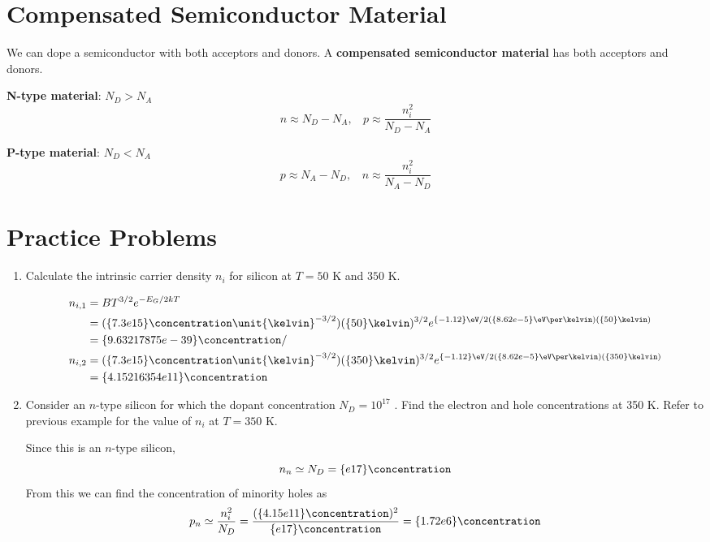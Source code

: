 \section{Compensated Semiconductor Material}
We can dope a semiconductor with both acceptors and donors. A \textbf{compensated semiconductor material} has both acceptors and donors.

\textbf{N-type material}: $N_D > N_A$
\[n \approx N_D - N_A, ~~~~ p \approx \frac{n_i^2}{N_D - N_A}\]

\textbf{P-type material}: $N_D < N_A$
\[p \approx N_A - N_D, ~~~~ n \approx \frac{n_i^2}{N_A - N_D}\]

\section{Practice Problems}
    \begin{enumerate}
        \item Calculate the intrinsic carrier density $n_i$ for silicon at $T = 50$ K and $350$ K.
        \begin{Ans}
            \begin{align*}
                n_{i,1} &= BT^{3/2} e^{-E_G / 2kT} \\
                &= (\qty{7.3e15}{\concentration} \unit{\kelvin}^{-3/2})(\qty{50}{\kelvin})^{3/2} e^{\qty{-1.12}{\eV} / 2(\qty{8.62e-5}{\eV\per\kelvin}) (\qty{50}{\kelvin})} \\
                &= \qty{9.63217875e-39}{\concentration} / \\
                n_{i,2} &= (\qty{7.3e15}{\concentration} \unit{\kelvin}^{-3/2})(\qty{350}{\kelvin})^{3/2} e^{\qty{-1.12}{\eV} / 2(\qty{8.62e-5}{\eV\per\kelvin})(\qty{350}{\kelvin})} \\
                &= \qty{4.15216354e11}{\concentration}
            \end{align*}
        \end{Ans}

        \item Consider an $n$-type silicon for which the dopant concentration $N_D = 10^{17}$ \conc. Find the electron and hole concentrations at 350 K. Refer to previous example for the value of $n_i$ at $T = 350$ K.
        \begin{Ans}
            Since this is an $n$-type silicon, 
                \[n_n \simeq N_D = \qty{e17}{\concentration}\]
            From this we can find the concentration of minority holes as 
                \[p_n \simeq \frac{n_i^2}{N_D} = \frac{(\qty{4.15e11}{\concentration})^2}{\qty{e17}{\concentration}} = \qty{1.72e6}{\concentration}\]
        \end{Ans}


\end{enumerate}
